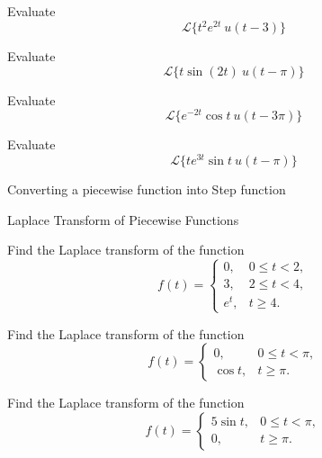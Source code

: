\documentclass[12pt, a4paper]{article}
\begin{document}
\clearpage

\begin{problem}
	Evaluate 
	\[\mathcal{L}\{t^2 e^{2t} \ u(t-3)\}\]
\end{problem}

\clearpage

\begin{problem}
	Evaluate 
	\[\mathcal{L}\{t \sin(2t) \ u(t-\pi)\}\]
\end{problem}

\clearpage

\begin{problem}
	Evaluate 
	\[\mathcal{L}\{e^{-2t} \cos t\ u(t-3\pi)\}\]
\end{problem}

\clearpage

\begin{problem}
	Evaluate 
	\[\mathcal{L}\{t e^{3t} \sin t\ u(t-\pi)\}\]
\end{problem}

\clearpage

\begin{heading}
	Converting a piecewise function into Step function
\end{heading}

\clearpage

\begin{heading}
	Laplace Transform of Piecewise Functions
\end{heading}

\vspace{10pt}

\begin{problem}
	Find the Laplace transform of the function
	\[
	f(t)=
	\begin{cases}
	0, & 0\le t<2,\\
	3, & 2\le t<4,\\
	e^t, & t\ge 4.
	\end{cases}
	\]
\end{problem}

\clearpage

\begin{problem}
	Find the Laplace transform of the function
	\[
	f(t)=
	\begin{cases}
	0, & 0\le t<\pi,\\
	\cos t, & t\ge \pi.
	\end{cases}
	\]
\end{problem}

\clearpage

\begin{problem}
	Find the Laplace transform of the function
	\[
	f(t)=
	\begin{cases}
	5\sin t, & 0\le t<\pi,\\
	0, & t\ge \pi.
	\end{cases}
	\]
\end{problem}
\end{document}
